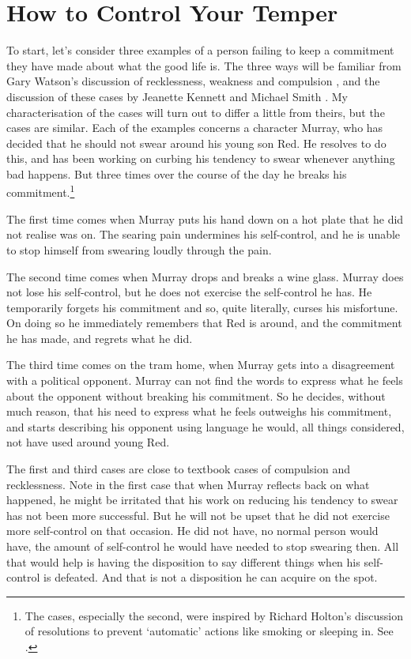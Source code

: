 \section{How to Control Your Temper} 

To start, let's consider three examples of a person failing to keep a commitment they have made about what the good life is. The three ways will be familiar from Gary Watson's discussion of recklessness, weakness and compulsion \citet{Watson1977}, and the discussion of these cases by Jeanette Kennett and Michael Smith \citet{KennettSmith1996a, KennettSmith1996b}. My characterisation of the cases will turn out to differ a little from theirs, but the cases are similar. Each of the examples concerns a character Murray, who has decided that he should not swear around his young son Red. He resolves to do this, and has been working on curbing his tendency to swear whenever anything bad happens. But three times over the course of the day he breaks his commitment.\footnote{The cases, especially the second, were inspired by Richard Holton's discussion of resolutions to prevent `automatic' actions like smoking or sleeping in. See \citet{Holton2003, Holton2004}.}

The first time comes when Murray puts his hand down on a hot plate that he did not realise was on. The searing pain undermines his self-control, and he is unable to stop himself from swearing loudly through the pain. 

The second time comes when Murray drops and breaks a wine glass. Murray does not lose his self-control, but he does not exercise the self-control he has. He temporarily forgets his commitment and so, quite literally, curses his misfortune. On doing so he immediately remembers that Red is around, and the commitment he has made, and regrets what he did.

The third time comes on the tram home, when Murray gets into a disagreement with a political opponent. Murray can not find the words to express what he feels about the opponent without breaking his commitment. So he decides, without much reason, that his need to express what he feels outweighs his commitment, and starts describing his opponent using language he would, all things considered, not have used around young Red.

The first and third cases are close to textbook cases of compulsion and recklessness. Note in the first case that when Murray reflects back on what happened, he might be irritated that his work on reducing his tendency to swear has not been more successful. But he will not be upset that he did not exercise more self-control on that occasion. He did not have, no normal person would have, the amount of self-control he would have needed to stop swearing then. All that would help is having the disposition to say different things when his self-control is defeated. And that is not a disposition he can acquire on the spot. 

